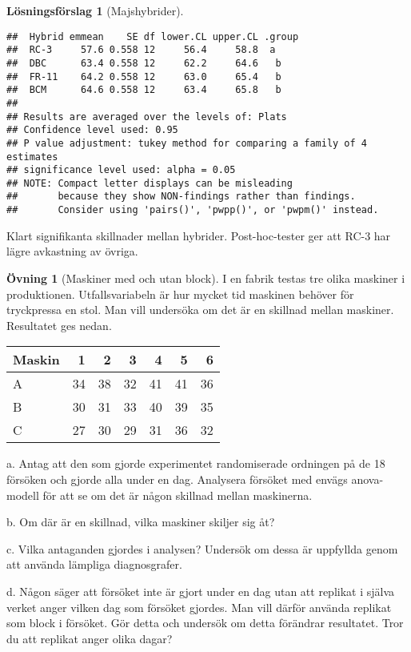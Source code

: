 \documentclass[
]{book}
\theoremstyle{definition}
\theoremstyle{definition}
\theoremstyle{definition}
\newtheorem{exercise}{Övning}[chapter]
\theoremstyle{definition}
\newtheorem{hypothesis}{Lösningsförslag}[chapter]
\theoremstyle{remark}
\begin{document}
\begin{hypothesis}[Majshybrider]
\begin{verbatim}
##  Hybrid emmean    SE df lower.CL upper.CL .group
##  RC-3     57.6 0.558 12     56.4     58.8  a    
##  DBC      63.4 0.558 12     62.2     64.6   b   
##  FR-11    64.2 0.558 12     63.0     65.4   b   
##  BCM      64.6 0.558 12     63.4     65.8   b   
## 
## Results are averaged over the levels of: Plats 
## Confidence level used: 0.95 
## P value adjustment: tukey method for comparing a family of 4 estimates 
## significance level used: alpha = 0.05 
## NOTE: Compact letter displays can be misleading
##       because they show NON-findings rather than findings.
##       Consider using 'pairs()', 'pwpp()', or 'pwpm()' instead.
\end{verbatim}

Klart signifikanta skillnader mellan hybrider. Post-hoc-tester ger att RC-3 har lägre avkastning av övriga.
\end{hypothesis}

\begin{exercise}[Maskiner med och utan block]
I en fabrik testas tre olika maskiner i produktionen. Utfallsvariabeln är hur mycket tid maskinen behöver för tryckpressa en stol. Man vill undersöka om det är en skillnad mellan maskiner. Resultatet ges nedan.

\begin{table}
\centering
\begin{tabular}[t]{lrrrrrr}
\toprule
Maskin & 1 & 2 & 3 & 4 & 5 & 6\\
\midrule
A & 34 & 38 & 32 & 41 & 41 & 36\\
B & 30 & 31 & 33 & 40 & 39 & 35\\
C & 27 & 30 & 29 & 31 & 36 & 32\\
\bottomrule
\end{tabular}
\end{table}

a. Antag att den som gjorde experimentet randomiserade ordningen på de 18 försöken och gjorde alla under en dag. Analysera försöket med envägs anova-modell för att se om det är någon skillnad mellan maskinerna.

b. Om där är en skillnad, vilka maskiner skiljer sig åt?

c. Vilka antaganden gjordes i analysen? Undersök om dessa är uppfyllda genom att använda lämpliga diagnosgrafer.

d. Någon säger att försöket inte är gjort under en dag utan att replikat i själva verket anger vilken dag som försöket gjordes. Man vill därför använda replikat som block i försöket. Gör detta och undersök om detta förändrar resultatet. Tror du att replikat anger olika dagar?
\end{exercise}
\end{document}
